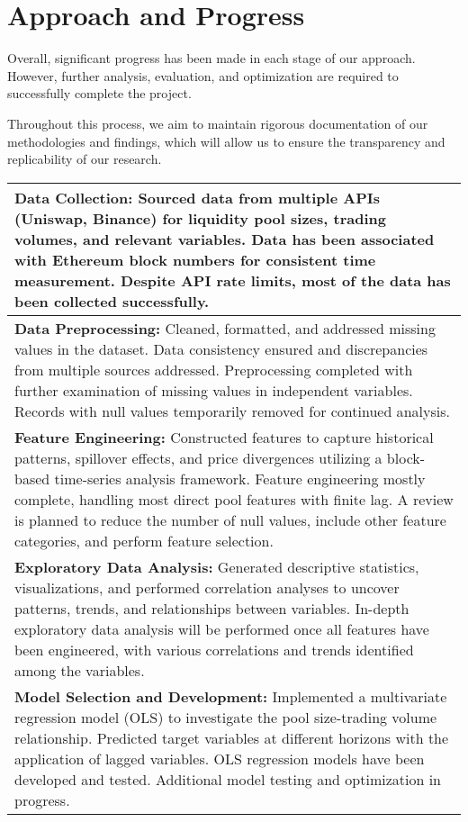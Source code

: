 \documentclass{article}
\begin{document}
{\section*{Approach and Progress}
Overall, significant progress has been made in each stage of our approach. However, further analysis, evaluation, and optimization are required to successfully complete the project.

Throughout this process, we aim to maintain rigorous documentation of our methodologies and findings, which will allow us to ensure the transparency and replicability of our research.

\begin{table}[htbp]
\centering
\small
\begin{tabularx}{\linewidth}{|>{\raggedright\arraybackslash}X|}
\hline
\textbf{Data Collection:} Sourced data from multiple APIs (Uniswap, Binance) for liquidity pool sizes, trading volumes, and relevant variables. Data has been associated with Ethereum block numbers for consistent time measurement. Despite API rate limits, most of the data has been collected successfully. \\
\hline
\textbf{Data Preprocessing:} Cleaned, formatted, and addressed missing values in the dataset. Data consistency ensured and discrepancies from multiple sources addressed. Preprocessing completed with further examination of missing values in independent variables. Records with null values temporarily removed for continued analysis. \\
\hline
\textbf{Feature Engineering:} Constructed features to capture historical patterns, spillover effects, and price divergences utilizing a block-based time-series analysis framework. Feature engineering mostly complete, handling most direct pool features with finite lag. A review is planned to reduce the number of null values, include other feature categories, and perform feature selection. \\
\hline
\textbf{Exploratory Data Analysis:} Generated descriptive statistics, visualizations, and performed correlation analyses to uncover patterns, trends, and relationships between variables. In-depth exploratory data analysis will be performed once all features have been engineered, with various correlations and trends identified among the variables. \\
\hline
\textbf{Model Selection and Development:} Implemented a multivariate regression model (OLS) to investigate the pool size-trading volume relationship. Predicted target variables at different horizons with the application of lagged variables. OLS regression models have been developed and tested. Additional model testing and optimization in progress. \\

\end{tabularx}
\end{table}}
\end{document}
